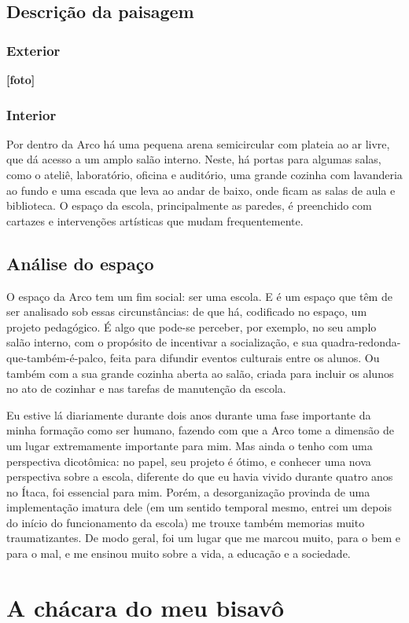 \documentclass[12pt]{article}
\begin{document}
\subsection{Descrição da paisagem}
\subsubsection{Exterior}
\textbf{[foto]}
\subsubsection{Interior}
Por dentro da Arco há uma pequena arena semicircular com plateia ao ar livre, que dá acesso a um amplo salão interno. Neste, há portas para algumas salas, como o ateliê, laboratório, oficina e auditório, uma grande cozinha com lavanderia ao fundo e uma escada que leva ao andar de baixo, onde ficam as salas de aula e biblioteca. O espaço da escola, principalmente as paredes, é preenchido com cartazes e intervenções artísticas que mudam frequentemente.
\subsection{Análise do espaço}
O espaço da Arco tem um fim social: ser uma escola. E é um espaço que têm de ser analisado sob essas circunstâncias: de que há, codificado no espaço, um projeto pedagógico. É algo que pode-se perceber, por exemplo, no seu amplo salão interno, com o propósito de incentivar a socialização, e sua quadra-redonda-que-também-é-palco, feita para difundir eventos culturais entre os alunos. Ou também com a sua grande cozinha aberta ao salão, criada para incluir os alunos no ato de cozinhar e nas tarefas de manutenção da escola.

Eu estive lá diariamente durante dois anos durante uma fase importante da minha formação como ser humano, fazendo com que a Arco tome a dimensão de um lugar extremamente importante para mim. Mas ainda o tenho com uma perspectiva dicotômica: no papel, seu projeto é ótimo, e conhecer uma nova perspectiva sobre a escola, diferente do que eu havia vivido durante quatro anos no Ítaca, foi essencial para mim. Porém, a desorganização provinda de uma implementação imatura dele (em um sentido temporal mesmo, entrei um depois do início do funcionamento da escola) me trouxe também memorias muito traumatizantes. De modo geral, foi um lugar que me marcou muito, para o bem e para o mal, e me ensinou muito sobre a vida, a educação e a sociedade.

\section{A chácara do meu bisavô}
\end{document}
